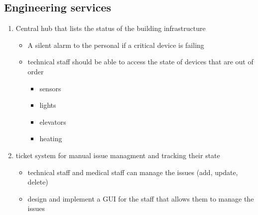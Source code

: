 \subsection{Engineering services}
\label{sec:org6af4132}
\begin{enumerate}
\item Central hub that lists the status of the building infrastructure
\label{sec:orgeccf6fd}
\begin{itemize}
\item A silent alarm to the personal if a critical device is failing
\item technical staff should be able to access the state of devices that are out of order
\begin{itemize}
\item sensors
\item lights
\item elevators
\item heating
\end{itemize}
\end{itemize}
\item ticket system for manual issue managment and tracking their state
\label{sec:orge41382f}
\begin{itemize}
\item technical staff and medical staff can manage the issues (add, update, delete)
\item design and implement a GUI for the staff that allows them to manage the issues
\end{itemize}
\end{enumerate}

